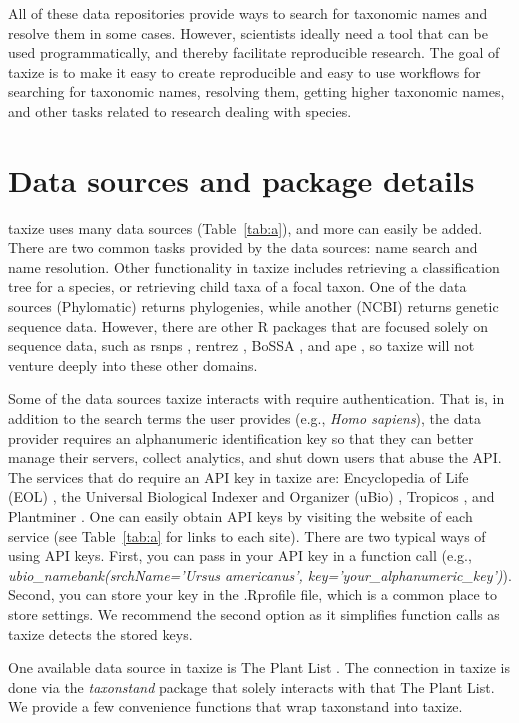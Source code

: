 \documentclass[10pt]{article}\usepackage[]{graphicx}\usepackage[]{color}
\begin{document}
All of these data repositories provide ways to search for taxonomic names and resolve them in some cases. However, scientists ideally need a tool that can be used programmatically, and thereby facilitate reproducible research. The goal of taxize is to make it easy to create reproducible and easy to use workflows for searching for taxonomic names, resolving them, getting higher taxonomic names, and other tasks related to research dealing with species. 
 

\section*{Data sources and package details}
taxize uses many data sources (Table~\ref{tab:a}), and more can easily be added. There are two common tasks provided by the data sources: name search and name resolution. Other functionality in taxize includes retrieving a classification tree for a species, or retrieving child taxa of a focal taxon. One of the data sources (Phylomatic) returns phylogenies, while another (NCBI) returns genetic sequence data. However, there are other R packages that are focused solely on sequence data, such as rsnps \cite{chamberlain2013}, rentrez \cite{winter2013}, BoSSA \cite{lefeuvre2010}, and ape \cite{paradis2004}, so taxize will not venture deeply into these other domains. 

Some of the data sources taxize interacts with require authentication. That is, in addition to the search terms the user provides (e.g., \emph{Homo sapiens}), the data provider requires an alphanumeric identification key so that they can better manage their servers, collect analytics, and shut down users that abuse the API. The services that do require an API key in taxize are: Encyclopedia of Life (EOL) \cite{eol}, the Universal Biological Indexer and Organizer (uBio) \cite{ubio}, Tropicos \cite{tropicos}, and Plantminer \cite{carvalho2010plantminer}. One can easily obtain API keys by visiting the website of each service (see Table~\ref{tab:a} for links to each site). There are two typical ways of using API keys. First, you can pass in your API key in a function call (e.g., \emph{ubio\_namebank(srchName='Ursus americanus', key='your\_alphanumeric\_key')}). Second, you can store your key in the .Rprofile file, which is a common place to store settings. We recommend the second option as it simplifies function calls as taxize detects the stored keys.

One available data source in taxize is The Plant List \cite{theplantlist}. The connection in taxize is done via the \emph{taxonstand} package \cite{Cayuela_2012} that solely interacts with that The Plant List. We provide a few convenience functions that wrap taxonstand into taxize.
\end{document}
